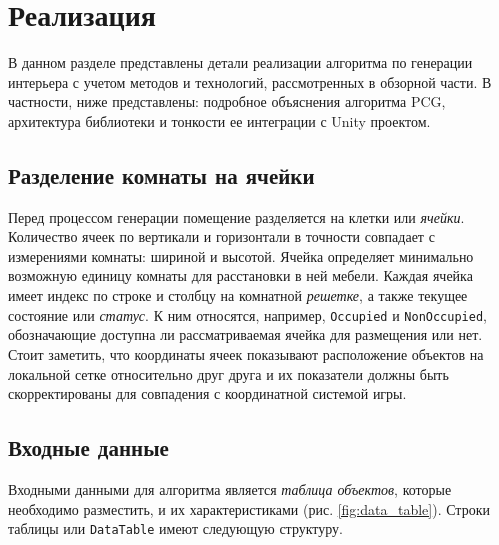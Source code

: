
\section{Реализация}

В данном разделе представлены детали реализации алгоритма по генерации интерьера с учетом методов и технологий, рассмотренных в обзорной части. В частности, ниже представлены: подробное объяснения алгоритма PCG, архитектура библиотеки и тонкости ее интеграции с Unity проектом.

\subsection{Разделение комнаты на ячейки}

Перед процессом генерации помещение разделяется на клетки или \textit{ячейки}. Количество ячеек по вертикали и горизонтали в точности совпадает с измерениями комнаты: шириной и высотой. Ячейка определяет минимально возможную единицу комнаты для расстановки в ней мебели. Каждая ячейка имеет индекс по строке и столбцу на комнатной \textit{решетке}, а также текущее состояние или \textit{статус}. К ним относятся, например, \texttt{Occupied} и \texttt{NonOccupied}, обозначающие доступна ли рассматриваемая ячейка для размещения или нет. Стоит заметить, что координаты ячеек показывают расположение объектов на локальной сетке относительно друг друга и их показатели должны быть скорректированы для совпадения с координатной системой игры.

\subsection{Входные данные}
Входными данными для алгоритма является \textit{таблица объектов}, которые необходимо разместить, и их характеристиками (рис. \ref{fig:data_table}). Строки таблицы или \texttt{DataTable} имеют следующую структуру.

